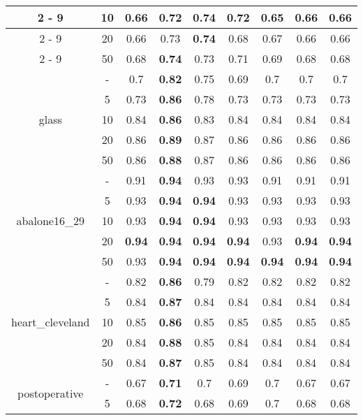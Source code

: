 \begin{table}[H]
\begin{center}
{\begin{tabular}{c|c|ccccccc}
				\cline{2%
					-%
					9}%
				&10&0.66&0.72&\textbf{0.74}&0.72&0.65&0.66&0.66\\%
				\cline{2%
					-%
					9}%
				&20&0.66&0.73&\textbf{0.74}&0.68&0.67&0.66&0.66\\%
				\cline{2%
					-%
					9}%
				&50&0.68&\textbf{0.74}&0.73&0.71&0.69&0.68&0.68\\%
				\hline%
				\multirow{5}{*}{glass}&{-}&0.7&\textbf{0.82}&0.75&0.69&0.7&0.7&0.7\\%
				\cline{2%
					-%
					9}%
				&5&0.73&\textbf{0.86}&0.78&0.73&0.73&0.73&0.73\\%
				\cline{2%
					-%
					9}%
				&10&0.84&\textbf{0.86}&0.83&0.84&0.84&0.84&0.84\\%
				\cline{2%
					-%
					9}%
				&20&0.86&\textbf{0.89}&0.87&0.86&0.86&0.86&0.86\\%
				\cline{2%
					-%
					9}%
				&50&0.86&\textbf{0.88}&0.87&0.86&0.86&0.86&0.86\\%
				\hline%
				\multirow{5}{*}{abalone16\_29}&{-}&0.91&\textbf{0.94}&0.93&0.93&0.91&0.91&0.91\\%
				\cline{2%
					-%
					9}%
				&5&0.93&\textbf{0.94}&\textbf{0.94}&0.93&0.93&0.93&0.93\\%
				\cline{2%
					-%
					9}%
				&10&0.93&\textbf{0.94}&\textbf{0.94}&0.93&0.93&0.93&0.93\\%
				\cline{2%
					-%
					9}%
				&20&\textbf{0.94}&\textbf{0.94}&\textbf{0.94}&\textbf{0.94}&0.93&\textbf{0.94}&\textbf{0.94}\\%
				\cline{2%
					-%
					9}%
				&50&0.93&\textbf{0.94}&\textbf{0.94}&\textbf{0.94}&\textbf{0.94}&\textbf{0.94}&\textbf{0.94}\\%
				\hline%
				\multirow{5}{*}{heart\_cleveland}&{-}&0.82&\textbf{0.86}&0.79&0.82&0.82&0.82&0.82\\%
				\cline{2%
					-%
					9}%
				&5&0.84&\textbf{0.87}&0.84&0.84&0.84&0.84&0.84\\%
				\cline{2%
					-%
					9}%
				&10&0.85&\textbf{0.86}&0.85&0.85&0.85&0.85&0.85\\%
				\cline{2%
					-%
					9}%
				&20&0.84&\textbf{0.88}&0.85&0.84&0.84&0.84&0.84\\%
				\cline{2%
					-%
					9}%
				&50&0.84&\textbf{0.87}&0.85&0.84&0.84&0.84&0.84\\%
				\hline%
				\multirow{5}{*}{postoperative}&{-}&0.67&\textbf{0.71}&0.7&0.69&0.7&0.67&0.67\\%
				\cline{2%
					-%
					9}%
				&5&0.68&\textbf{0.72}&0.68&0.69&0.7&0.68&0.68\\%

\end{tabular}}
\end{center}
\end{table}
